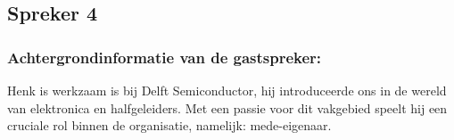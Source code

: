 \subsection{Spreker 4}
\subsubsection{Achtergrondinformatie van de gastspreker:}
Henk is werkzaam is bij Delft Semiconductor, hij introduceerde ons in de wereld van elektronica en halfgeleiders. Met een passie voor dit vakgebied speelt hij een cruciale rol binnen de organisatie, namelijk: mede-eigenaar.

